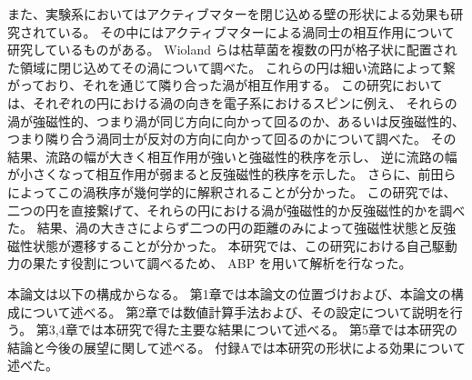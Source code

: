 \documentclass[/Users/ikedahajime/GitHub/reserch/master_report/thesis]{subfiles}
\begin{document}
また、実験系においてはアクティブマターを閉じ込める壁の形状による効果も研究されている。%
その中にはアクティブマターによる渦同士の相互作用について研究しているものがある。
Wioland らは枯草菌を複数の円が格子状に配置された領域に閉じ込めてその渦について調べた\cite{wiolandFerromagneticAntiferromagneticOrder2016}。
これらの円は細い流路によって繋がっており、それを通じて隣り合った渦が相互作用する。
この研究においては、それぞれの円における渦の向きを電子系におけるスピンに例え、
それらの渦が強磁性的、つまり渦が同じ方向に向かって回るのか、あるいは反強磁性的、
つまり隣り合う渦同士が反対の方向に向かって回るのかについて調べた。
その結果、流路の幅が大きく相互作用が強いと強磁性的秩序を示し、
逆に流路の幅が小さくなって相互作用が弱まると反強磁性的秩序を示した。
さらに、前田らによってこの渦秩序が幾何学的に解釈されることが分かった\cite{beppuGeometrydrivenCollectiveOrdering2017}。
この研究では、二つの円を直接繋げて、それらの円における渦が強磁性的か反強磁性的かを調べた。
結果、渦の大きさによらず二つの円の距離のみによって強磁性状態と反強磁性状態が遷移することが分かった。
本研究では、この研究における自己駆動力の果たす役割について調べるため、 ABP を用いて解析を行なった。


本論文は以下の構成からなる。
第1章では本論文の位置づけおよび、本論文の構成について述べる。
第2章では数値計算手法および、その設定について説明を行う。
第3,4章では本研究で得た主要な結果について述べる。
第5章では本研究の結論と今後の展望に関して述べる。
付録Aでは本研究の形状による効果について述べた。
\end{document}
